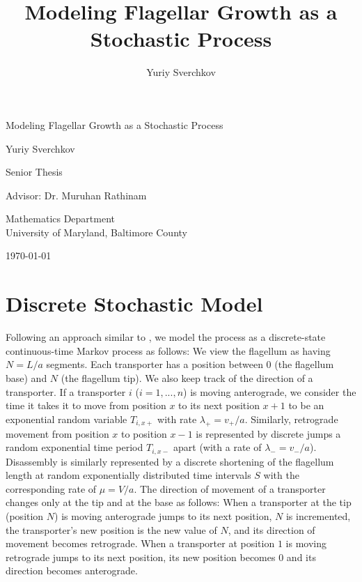 \documentclass[titlepage]{article}
\author{Yuriy Sverchkov}
\title{Modeling Flagellar Growth as a Stochastic Process}
\begin{document}

\begin{titlepage}
\begin{center}

\vspace*{2.5in}
{\Large Modeling Flagellar Growth as a Stochastic Process}

\vspace{0.5in}
{\large Yuriy Sverchkov}

\vfill
{\Large Senior Thesis\\ }

\vspace{0.25in}
{\large Advisor: Dr. Muruhan Rathinam

\vspace{0.25in}
Mathematics Department\\ University of Maryland, Baltimore County}

\vspace{0.5in}
\today

\end{center}
\end{titlepage}



\section{Discrete Stochastic Model}
\label{sec:OriginalModel}

Following an approach similar to \cite{bressloff},
we model the process as a discrete-state continuous-time Markov process as follows:
We view the flagellum as having $N = L / a$ segments.
Each transporter has a position between $0$ (the flagellum base) and $N$ (the flagellum tip).
We also keep track of the direction of a transporter.
If a transporter $i$ ($i=1,...,n$) is moving anterograde, we consider the time it takes it to move from position $x$ to its next position $x+1$ to be an exponential random variable $T_{i,x+}$ with rate $\lambda_+ = v_+ / a$.
Similarly,  retrograde  movement from position $x$ to position $x-1$ is represented by discrete jumps a random exponential time period $T_{i,x-}$ apart (with a rate of $\lambda_- = v_- / a$).
Disassembly is similarly represented by a discrete shortening of the flagellum length at random exponentially distributed time intervals $S$ with the corresponding rate of $\mu = V / a$.
The direction of movement of a transporter changes only at the tip and at the base as follows:
When a transporter at the tip (position $N$) is moving anterograde jumps to its next position, $N$ is incremented, the transporter's new position is the new value of $N$, and its direction of movement becomes retrograde.
When a transporter at position $1$ is moving retrograde jumps to its next position, its new position becomes $0$ and its direction becomes anterograde.
\end{document}
